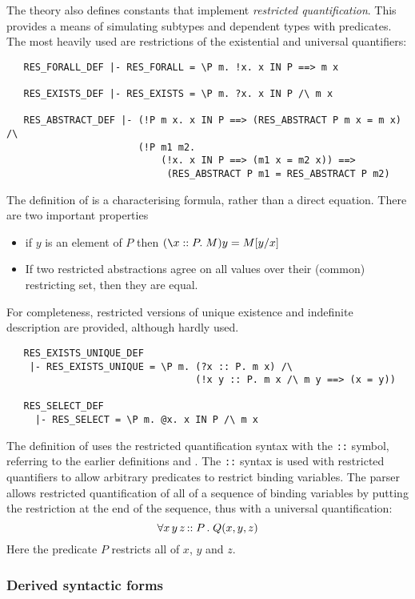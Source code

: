 %
The theory  also defines constants that implement
\emph{restricted quantification}. This provides a means of simulating
subtypes and dependent types with predicates. The most heavily used
are restrictions of the existential and universal quantifiers:
%
\begin{verbatim}
   RES_FORALL_DEF |- RES_FORALL = \P m. !x. x IN P ==> m x

   RES_EXISTS_DEF |- RES_EXISTS = \P m. ?x. x IN P /\ m x

   RES_ABSTRACT_DEF |- (!P m x. x IN P ==> (RES_ABSTRACT P m x = m x) /\
                       (!P m1 m2.
                           (!x. x IN P ==> (m1 x = m2 x)) ==>
                            (RES_ABSTRACT P m1 = RES_ABSTRACT P m2)
\end{verbatim}
%
The definition of  is a characterising formula, rather
than a direct equation.  There are two important properties
\begin{itemize}
\item if $y$ is an element of $P$ then $(\bs{}x :: P.\; M)
  y = M[y/x]$
\item If two restricted abstractions agree on all values over their
  (common) restricting set, then they are equal.
\end{itemize}

For completeness, restricted versions of unique existence and
indefinite description are provided, although hardly used.
\begin{verbatim}
   RES_EXISTS_UNIQUE_DEF
    |- RES_EXISTS_UNIQUE = \P m. (?x :: P. m x) /\
                                 (!x y :: P. m x /\ m y ==> (x = y))

   RES_SELECT_DEF
     |- RES_SELECT = \P m. @x. x IN P /\ m x
\end{verbatim}

The definition of  uses the restricted
quantification syntax with the {\small\verb+::+} symbol, referring to
the earlier definitions \ml{RES\_EXISTS} and \ml{RES\_FORALL}.
The \texttt{::} syntax is used with restricted quantifiers to allow
arbitrary predicates to restrict binding variables. The \HOL{} parser
allows restricted quantification of all of a sequence of binding
variables by putting the restriction at the end of the sequence, thus
with a universal quantification:
%
\[
\forall x \, y \, z \, {\tt ::} \; P \, . \; Q(x,y,z)
\]
%
Here the predicate $P$ restricts all of $x$, $y$ and $z$.

\subsubsection{Derived syntactic forms}\label{derived-terms}

